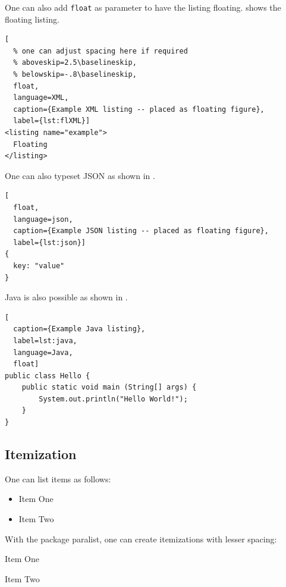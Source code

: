 One can also add \verb+float+ as parameter to have the listing floating.
 shows the floating listing.

\begin{ltgexample}
\begin{lstlisting}[
  % one can adjust spacing here if required
  % aboveskip=2.5\baselineskip,
  % belowskip=-.8\baselineskip,
  float,
  language=XML,
  caption={Example XML listing -- placed as floating figure},
  label={lst:flXML}]
<listing name="example">
  Floating
</listing>
\end{lstlisting}
\end{ltgexample}

One can also typeset JSON as shown in .

\begin{ltgexample}
\begin{lstlisting}[
  float,
  language=json,
  caption={Example JSON listing -- placed as floating figure},
  label={lst:json}]
{
  key: "value"
}
\end{lstlisting}
\end{ltgexample}

Java is also possible as shown in .

\begin{ltgexample}
\begin{lstlisting}[
  caption={Example Java listing},
  label=lst:java,
  language=Java,
  float]
public class Hello {
    public static void main (String[] args) {
        System.out.println("Hello World!");
    }
}
\end{lstlisting}
\end{ltgexample}

\subsection{Itemization}

One can list items as follows:

\begin{ltgexample}
\begin{itemize}
  \item Item One
  \item Item Two
\end{itemize}
\end{ltgexample}

With the package paralist, one can create itemizations with lesser spacing:

\begin{ltgexample}
\begin{compactitem}
  \item Item One
  \item Item Two
\end{compactitem}
\end{ltgexample}

